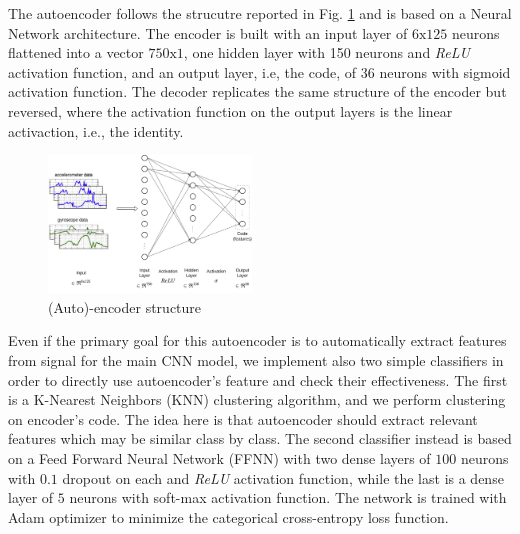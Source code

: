 The autoencoder follows the strucutre reported in
Fig. \ref{fig:encoder-structure} and is based on a Neural Network
architecture. The encoder is built with an input layer of
$6\text{x}125$ neurons flattened into a vector $750\text{x}1$, one hidden
layer with 150 neurons and \textit{ReLU} activation function, and an output
layer, i.e, the code, of $36$ neurons with sigmoid activation
function. The decoder replicates the same structure of the encoder but
reversed, where the activation function on the output layers is the
linear activaction, i.e., the identity.
\begin{figure}[H]
  \centering
  \includegraphics[width=0.48\textwidth]{images/encoder.png}
  \caption{(Auto)-encoder structure}
  \label{fig:encoder-structure}
\end{figure}

Even if the primary goal for this autoencoder is to automatically
extract features from signal for the main CNN model, we implement also
two simple classifiers in order to directly use autoencoder's feature
and check their effectiveness.  The first is a K-Nearest Neighbors
(KNN) clustering algorithm, and we perform clustering on encoder's
code. The idea here is that autoencoder should extract relevant
features which may be similar class by class.  The second classifier
instead is based on a Feed Forward Neural Network (FFNN) with two
dense layers of $100$ neurons with $0.1$ dropout on each and \textit{ReLU}
activation function, while the last is a dense layer of $5$ neurons
with soft-max activation function. The network is trained with Adam
optimizer to minimize the categorical cross-entropy loss function.

